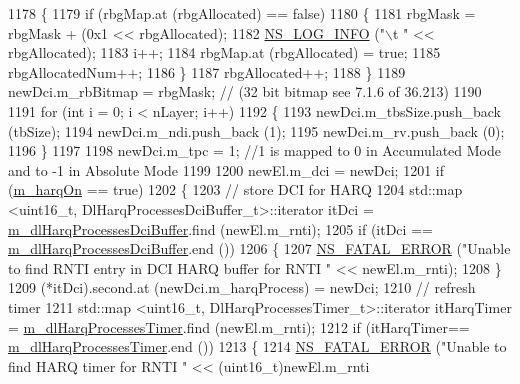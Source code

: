 \begin{DoxyCode}
1178         \{
1179           \textcolor{keywordflow}{if} (rbgMap.at (rbgAllocated) == \textcolor{keyword}{false})
1180             \{
1181               rbgMask = rbgMask + (0x1 << rbgAllocated);
1182               \hyperlink{group__logging_gafbd73ee2cf9f26b319f49086d8e860fb}{NS\_LOG\_INFO} (\textcolor{stringliteral}{"\(\backslash\)t "} << rbgAllocated);
1183               i++;
1184               rbgMap.at (rbgAllocated) = \textcolor{keyword}{true};
1185               rbgAllocatedNum++;
1186             \}
1187           rbgAllocated++;
1188         \}
1189       newDci.m\_rbBitmap = rbgMask; \textcolor{comment}{// (32 bit bitmap see 7.1.6 of 36.213)}
1190 
1191       \textcolor{keywordflow}{for} (\textcolor{keywordtype}{int} i = 0; i < nLayer; i++)
1192         \{
1193           newDci.m\_tbsSize.push\_back (tbSize);
1194           newDci.m\_ndi.push\_back (1);
1195           newDci.m\_rv.push\_back (0);
1196         \}
1197 
1198       newDci.m\_tpc = 1; \textcolor{comment}{//1 is mapped to 0 in Accumulated Mode and to -1 in Absolute Mode}
1199 
1200       newEl.m\_dci = newDci;
1201       \textcolor{keywordflow}{if} (\hyperlink{classns3_1_1RrFfMacScheduler_aa57694b4b80d2dc907f1e5281d3defab}{m\_harqOn} == \textcolor{keyword}{true})
1202         \{
1203           \textcolor{comment}{// store DCI for HARQ}
1204           std::map <uint16\_t, DlHarqProcessesDciBuffer\_t>::iterator itDci = 
      \hyperlink{classns3_1_1RrFfMacScheduler_a6611390f9589d1df0b0f4c0932219eeb}{m\_dlHarqProcessesDciBuffer}.find (newEl.m\_rnti);
1205           \textcolor{keywordflow}{if} (itDci == \hyperlink{classns3_1_1RrFfMacScheduler_a6611390f9589d1df0b0f4c0932219eeb}{m\_dlHarqProcessesDciBuffer}.end ())
1206             \{
1207               \hyperlink{group__fatal_ga5131d5e3f75d7d4cbfd706ac456fdc85}{NS\_FATAL\_ERROR} (\textcolor{stringliteral}{"Unable to find RNTI entry in DCI HARQ buffer for RNTI "} << 
      newEl.m\_rnti);
1208             \}
1209           (*itDci).second.at (newDci.m\_harqProcess) = newDci;
1210           \textcolor{comment}{// refresh timer}
1211           std::map <uint16\_t, DlHarqProcessesTimer\_t>::iterator itHarqTimer =  
      \hyperlink{classns3_1_1RrFfMacScheduler_ab5040cff67dad6c8fdfc9c32c90916df}{m\_dlHarqProcessesTimer}.find (newEl.m\_rnti);
1212           \textcolor{keywordflow}{if} (itHarqTimer== \hyperlink{classns3_1_1RrFfMacScheduler_ab5040cff67dad6c8fdfc9c32c90916df}{m\_dlHarqProcessesTimer}.end ())
1213             \{
1214               \hyperlink{group__fatal_ga5131d5e3f75d7d4cbfd706ac456fdc85}{NS\_FATAL\_ERROR} (\textcolor{stringliteral}{"Unable to find HARQ timer for RNTI "} << (uint16\_t)newEl.m\_rnti

\end{DoxyCode}
